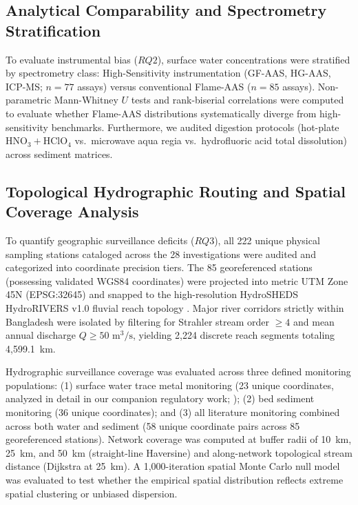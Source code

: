 \documentclass[authoryear,preprint,12pt]{elsarticle}
\begin{document}
\subsection{Analytical Comparability and Spectrometry Stratification}
To evaluate instrumental bias ($RQ2$), surface water concentrations were stratified by spectrometry class: High-Sensitivity instrumentation (GF-AAS, HG-AAS, ICP-MS; $n=77$ assays) versus conventional Flame-AAS ($n=85$ assays). Non-parametric Mann-Whitney $U$ tests and rank-biserial correlations were computed to evaluate whether Flame-AAS distributions systematically diverge from high-sensitivity benchmarks. Furthermore, we audited digestion protocols (hot-plate $\text{HNO}_3+\text{HClO}_4$ vs.\ microwave aqua regia vs.\ hydrofluoric acid total dissolution) across sediment matrices.

\subsection{Topological Hydrographic Routing and Spatial Coverage Analysis}
To quantify geographic surveillance deficits ($RQ3$), all 222 unique physical sampling stations cataloged across the 28 investigations were audited and categorized into coordinate precision tiers. The 85 georeferenced stations (possessing validated WGS84 coordinates) were projected into metric UTM Zone 45N (EPSG:32645) and snapped to the high-resolution HydroSHEDS HydroRIVERS v1.0 fluvial reach topology \citep{Lehner2013}. Major river corridors strictly within Bangladesh were isolated by filtering for Strahler stream order $\ge 4$ and mean annual discharge $Q \ge 50\text{ m}^3/\text{s}$, yielding 2,224 discrete reach segments totaling 4,599.1~km.

Hydrographic surveillance coverage was evaluated across three defined monitoring populations: (1) surface water trace metal monitoring (23 unique coordinates, analyzed in detail in our companion regulatory work; \citealp{Mazumder2026Water}); (2) bed sediment monitoring (36 unique coordinates); and (3) all literature monitoring combined across both water and sediment (58 unique coordinate pairs across 85 georeferenced stations). Network coverage was computed at buffer radii of 10~km, 25~km, and 50~km (straight-line Haversine) and along-network topological stream distance (Dijkstra at 25~km). A 1,000-iteration spatial Monte Carlo null model was evaluated to test whether the empirical spatial distribution reflects extreme spatial clustering or unbiased dispersion.
\end{document}
